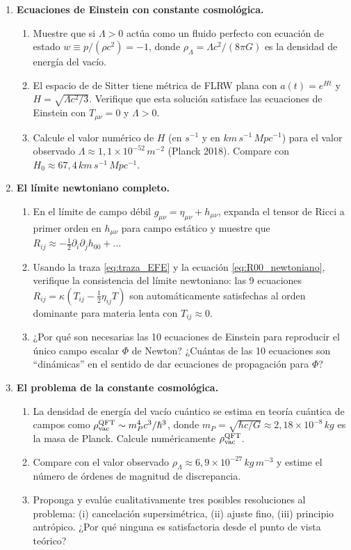 \begin{enumerate}[leftmargin=2em, label=\textbf{P\thechapter.\arabic*.}]
  \item \textbf{Ecuaciones de Einstein con constante cosmológica.}
  \begin{enumerate}[label=(\alph*)]
    \item Muestre que si $\Lambda > 0$ actúa como un fluido perfecto con ecuación de estado $w \equiv p/(\rho c^2) = -1$, donde $\rho_\Lambda = \Lambda c^2/(8\pi G)$ es la densidad de energía del vacío.
    \item El espacio de de Sitter tiene métrica de FLRW plana con $a(t) = e^{Ht}$ y $H = \sqrt{\Lambda c^2/3}$. Verifique que esta solución satisface las ecuaciones de Einstein con $T_{\mu\nu} = 0$ y $\Lambda > 0$.
    \item Calcule el valor numérico de $H$ (en $\si{s^{-1}}$ y en $\si{km\,s^{-1}\,Mpc^{-1}}$) para el valor observado $\Lambda \approx 1{,}1\times10^{-52}\,\si{m^{-2}}$ (Planck 2018). Compare con $H_0 \approx 67{,}4\,\si{km\,s^{-1}\,Mpc^{-1}}$.
  \end{enumerate}

  \item \textbf{El límite newtoniano completo.}
  \begin{enumerate}[label=(\alph*)]
    \item En el límite de campo débil $g_{\mu\nu} = \eta_{\mu\nu} + h_{\mu\nu}$, expanda el tensor de Ricci a primer orden en $h_{\mu\nu}$ para campo estático y muestre que $R_{ij} \approx -\frac{1}{2}\partial_i\partial_j h_{00} + \ldots$
    \item Usando la traza \eqref{eq:traza_EFE} y la ecuación \eqref{eq:R00_newtoniano}, verifique la consistencia del límite newtoniano: las 9 ecuaciones $R_{ij} = \kappa(T_{ij} - \frac{1}{2}\eta_{ij}T)$ son automáticamente satisfechas al orden dominante para materia lenta con $T_{ij} \approx 0$.
    \item ¿Por qué son necesarias las 10 ecuaciones de Einstein para reproducir el único campo escalar $\Phi$ de Newton? ¿Cuántas de las 10 ecuaciones son ``dinámicas'' en el sentido de dar ecuaciones de propagación para $\Phi$?
  \end{enumerate}

  \item \textbf{El problema de la constante cosmológica.}
  \begin{enumerate}[label=(\alph*)]
    \item La densidad de energía del vacío cuántico se estima en teoría cuántica de campos como $\rho_{\rm vac}^{\rm QFT} \sim m_P^4 c^3/\hbar^3$, donde $m_P = \sqrt{\hbar c/G} \approx 2{,}18\times10^{-8}\,\si{kg}$ es la masa de Planck. Calcule numéricamente $\rho_{\rm vac}^{\rm QFT}$.
    \item Compare con el valor observado $\rho_\Lambda \approx 6{,}9\times10^{-27}\,\si{kg\,m^{-3}}$ y estime el número de órdenes de magnitud de discrepancia.
    \item Proponga y evalúe cualitativamente tres posibles resoluciones al problema: (i) cancelación supersimétrica, (ii) ajuste fino, (iii) principio antrópico. ¿Por qué ninguna es satisfactoria desde el punto de vista teórico?
  \end{enumerate}


\end{enumerate}
